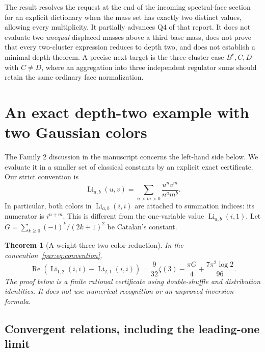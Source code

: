 \documentclass[11pt,a4paper]{article}
\numberwithin{equation}{section}
\newtheorem{theorem}{Theorem}[section]
\theoremstyle{definition}
\theoremstyle{remark}
\DeclareMathOperator{\Li}{Li}
\begin{document}
The result resolves the request at the end of the incoming
spectral-face section for an explicit dictionary when the mass set
has exactly two distinct values, allowing every multiplicity.  It
partially advances Q4 of that report.  It does not evaluate two
\emph{unequal} displaced masses above a third base mass, does not
prove that every two-cluster expression reduces to depth two, and
does not establish a minimal depth theorem.  A precise next target
is the three-cluster case $B^r,C,D$ with $C\ne D$, where an
aggregation into three independent regulator sums should retain
the same ordinary face normalization.


\section{An exact depth-two example with two Gaussian colors}
\label{par:sec:two-colors}

The Family 2 discussion in the manuscript \cite{repo} concerns
the left-hand side below. We evaluate it in a smaller set of
classical constants by an explicit exact certificate. Our strict convention is
\begin{equation}\label{par:eq:convention}
 \Li_{a,b}(u,v)=\sum_{n>m>0}\frac{u^n v^m}{n^a m^b}.
\end{equation}
In particular, both colors in $\Li_{a,b}(i,i)$ are attached to
summation indices: its numerator is $i^{n+m}$.
This is different from the one-variable value $\Li_{a,b}(i,1)$.
Let $G=\sum_{k\ge0}(-1)^k/(2k+1)^2$ be Catalan's constant.

\begin{theorem}[A weight-three two-color reduction]\label{par:thm:two-colors}
In the convention~\eqref{par:eq:convention},
\begin{equation}\label{par:eq:example}
 \boxed{\displaystyle
 \operatorname{Re}\!\left(\Li_{1,2}(i,i)-\Li_{2,1}(i,i)\right)
 =\frac{9}{32}\zeta(3)-\frac{\pi G}{4}
      +\frac{7\pi^2\log2}{96}.}
\end{equation}
The proof below is a finite rational certificate using double-shuffle
and distribution identities. It does not use numerical recognition or
an unproved inversion formula.
\end{theorem}

\subsection{Convergent relations, including the leading-one limit}
\end{document}

